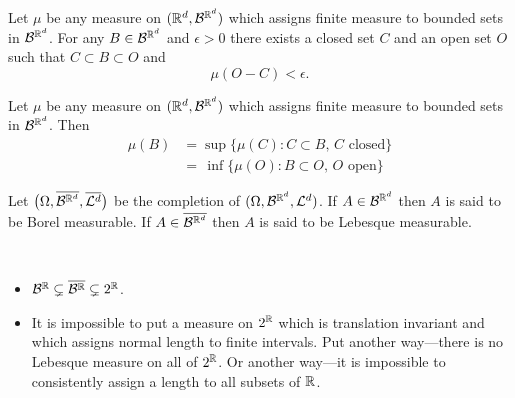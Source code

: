 \begin{theorem}[{\bf Regularity}]
\label{oir}
Let $\mu$ be any measure on $(\Bbb R^d,\mathcal B^{\Bbb R^d})$ which assigns finite measure to bounded sets in $\mathcal B^{\Bbb R^d}$.
For any  $B\in\mathcal B^{\Bbb R^d}$ and $\epsilon>0$ there exists a closed set $C$ and an open set $O$ such that $C\subset B\subset O$ and
\[\mathcal \mu(O-C)<\epsilon.\]
\end{theorem}

\begin{corollary}
\label{ir}
Let $\mu$ be any measure on $(\Bbb R^d,\mathcal B^{\Bbb R^d})$ which assigns finite measure to bounded sets in $\mathcal B^{\Bbb R^d}$. Then
\begin{align*}
\mathcal \mu(B)  &= \sup \{ \mathcal \mu(C):  C\subset B,\, \text{$C$ closed}\}\\
  &=\, \inf \{ \mu(O):  B\subset O,\, \text{$O$ open}\}
\end{align*}
\end{corollary}


\begin{definition}
Let $\bigl(\Omega,\overline{\mathcal B^{\Bbb R^d}},\overline{\mathcal L^d}\bigr)$ be the completion of $(\Omega, \mathcal B^{\Bbb R^d},\mathcal L^d)$. If $A\in \mathcal B^{\Bbb R^d}$ then $A$ is said to be {Borel measurable}. If $A\in \overline{\mathcal B^{\Bbb R^d}}$ then $A$ is said to be {Lebesque measurable}.
\end{definition}

\begin{theorem}
$\phantom{asdf}$
\begin{itemize}
\item $\mathcal B^{\Bbb R}\subsetneq \overline{\mathcal B^{\Bbb R}} \subsetneq 2^\Bbb R$.
\item It is impossible to put a measure on $2^\Bbb R$ which is translation invariant and which assigns normal length to finite intervals. Put another way---there is no Lebesque measure on all of $2^\Bbb R$. Or another way---it is impossible to consistently assign a length to all subsets of $\Bbb R$.
\end{itemize}
\end{theorem}





